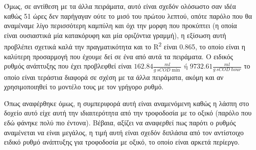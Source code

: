 \documentclass[11pt]{article}
\begin{document}
Όμως, σε αντίθεση με τα άλλα πειράματα, αυτό είναι σχεδόν ολόσωστο σαν ιδέα καθώς 51 ώρες δεν παρήγαγαν ούτε το μισό του πρώτου λεπτού, οπότε παρόλο που θα αναμέναμε λίγο περισσότερη καμπύλη και όχι την μορφη που προκύπτει (η οποία είναι ουσιαστικά μία κατακόρυφη και μία οριζόντια γραμμή), η εξίσωση αυτή προβλέπει σχετικά καλά την πραγματικότητα και το R\textsuperscript{2} είναι 0.865, το οποίο είναι η καλύτερη προσαρμογή που έχουμε δεί σε ένα από αυτά τα πειράματα. Ο ειδικός ρυθμός ανάπτυξης που έχει προβλεφθεί είναι \(162.84 \frac{ml}{g ~ sCOD \min } \text{ ή } 9732.61 \frac{ml}{g ~ sCOD ~ hour}\) το οποίο είναι τεράστια διαφορά σε σχέση με τα άλλα πειράματα, ακόμη και αν χρησιμοποιηθεί το μοντέλο τους με τον γρήγορο ρυθμό.

Όπως αναφέρθηκε όμως, η συμπεριφορά αυτή είναι αναμενόμενη καθώς η λάσπη στο δοχείο αυτό είχε αυτή την ιδιαιτερότητα από την τροφοδοσία με το οξικό (παρόλο που εδώ φάνηκε πολύ πιο έντονα). Βέβαια, αξίζει να αναφερθεί πως παρότι ο ρυθμός αναμένεται να είναι μεγάλος, η τιμή αυτή είναι σχεδόν διπλάσια από τον αντίστοιχο ειδικό ρυθμό ανάπτυξης για τροφοδοσία με οξικό, το οποίο είναι αρκετά περίεργο.
\end{document}
